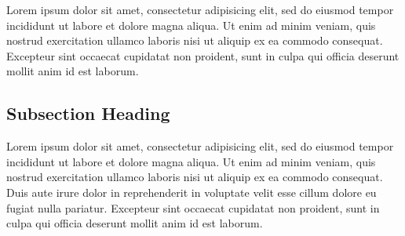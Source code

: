 {}

Lorem ipsum dolor sit amet, consectetur adipisicing elit, sed do eiusmod
tempor incididunt ut labore et dolore magna aliqua. Ut enim ad minim veniam,
quis nostrud exercitation ullamco laboris nisi ut aliquip ex ea commodo
consequat. Excepteur sint occaecat cupidatat non
proident, sunt in culpa qui officia deserunt mollit anim id est laborum.

\subsection*{Subsection Heading}
Lorem ipsum dolor sit amet, consectetur adipisicing elit, sed do eiusmod
tempor incididunt ut labore et dolore magna aliqua. Ut enim ad minim veniam,
quis nostrud exercitation ullamco laboris nisi ut aliquip ex ea commodo
consequat. Duis aute irure dolor in reprehenderit in voluptate velit esse
cillum dolore eu fugiat nulla pariatur. Excepteur sint occaecat cupidatat non
proident, sunt in culpa qui officia deserunt mollit anim id est laborum.


\lipsum[1-11]
